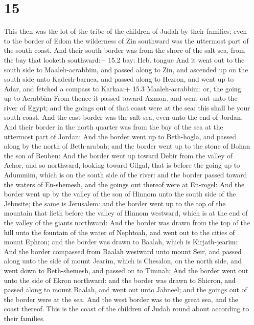 \hypertarget{section-14}{%
\section{15}\label{section-14}}

 This then was the lot of the tribe of the children of Judah
by their families; even to the border of Edom the wilderness of Zin
southward was the uttermost part of the south coast.  And
their south border was from the shore of the salt sea, from the bay that
looketh southward:+ 15.2 bay: Heb. tongue  And it went out
to the south side to Maaleh-acrabbim, and passed along to Zin, and
ascended up on the south side unto Kadesh-barnea, and passed along to
Hezron, and went up to Adar, and fetched a compass to Karkaa:+ 15.3
Maaleh-acrabbim: or, the going up to Acrabbim  From thence
it passed toward Azmon, and went out unto the river of Egypt; and the
goings out of that coast were at the sea: this shall be your south
coast.  And the east border was the salt sea, even unto the
end of Jordan. And their border in the north quarter was from the bay of
the sea at the uttermost part of Jordan:  And the border
went up to Beth-hogla, and passed along by the north of Beth-arabah; and
the border went up to the stone of Bohan the son of Reuben: 
And the border went up toward Debir from the valley of Achor, and so
northward, looking toward Gilgal, that is before the going up to
Adummim, which is on the south side of the river: and the border passed
toward the waters of En-shemesh, and the goings out thereof were at
En-rogel:  And the border went up by the valley of the son
of Hinnom unto the south side of the Jebusite; the same is Jerusalem:
and the border went up to the top of the mountain that lieth before the
valley of Hinnom westward, which is at the end of the valley of the
giants northward:  And the border was drawn from the top of
the hill unto the fountain of the water of Nephtoah, and went out to the
cities of mount Ephron; and the border was drawn to Baalah, which is
Kirjath-jearim:  And the border compassed from Baalah
westward unto mount Seir, and passed along unto the side of mount
Jearim, which is Chesalon, on the north side, and went down to
Beth-shemesh, and passed on to Timnah:  And the border went
out unto the side of Ekron northward: and the border was drawn to
Shicron, and passed along to mount Baalah, and went out unto Jabneel;
and the goings out of the border were at the sea.  And the
west border was to the great sea, and the coast thereof. This is the
coast of the children of Judah round about according to their families.

